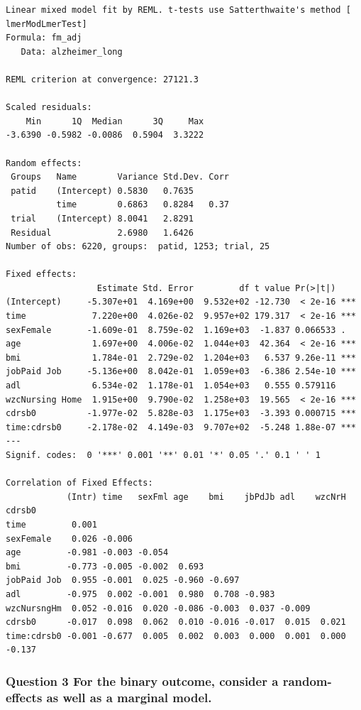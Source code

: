 \documentclass[
  11pt,
  letterpaper,
  DIV=11,
  numbers=noendperiod]{scrartcl}
\begin{document}
\begin{verbatim}
Linear mixed model fit by REML. t-tests use Satterthwaite's method [
lmerModLmerTest]
Formula: fm_adj
   Data: alzheimer_long

REML criterion at convergence: 27121.3

Scaled residuals: 
    Min      1Q  Median      3Q     Max 
-3.6390 -0.5982 -0.0086  0.5904  3.3222 

Random effects:
 Groups   Name        Variance Std.Dev. Corr
 patid    (Intercept) 0.5830   0.7635       
          time        0.6863   0.8284   0.37
 trial    (Intercept) 8.0041   2.8291       
 Residual             2.6980   1.6426       
Number of obs: 6220, groups:  patid, 1253; trial, 25

Fixed effects:
                  Estimate Std. Error         df t value Pr(>|t|)    
(Intercept)     -5.307e+01  4.169e+00  9.532e+02 -12.730  < 2e-16 ***
time             7.220e+00  4.026e-02  9.957e+02 179.317  < 2e-16 ***
sexFemale       -1.609e-01  8.759e-02  1.169e+03  -1.837 0.066533 .  
age              1.697e+00  4.006e-02  1.044e+03  42.364  < 2e-16 ***
bmi              1.784e-01  2.729e-02  1.204e+03   6.537 9.26e-11 ***
jobPaid Job     -5.136e+00  8.042e-01  1.059e+03  -6.386 2.54e-10 ***
adl              6.534e-02  1.178e-01  1.054e+03   0.555 0.579116    
wzcNursing Home  1.915e+00  9.790e-02  1.258e+03  19.565  < 2e-16 ***
cdrsb0          -1.977e-02  5.828e-03  1.175e+03  -3.393 0.000715 ***
time:cdrsb0     -2.178e-02  4.149e-03  9.707e+02  -5.248 1.88e-07 ***
---
Signif. codes:  0 '***' 0.001 '**' 0.01 '*' 0.05 '.' 0.1 ' ' 1

Correlation of Fixed Effects:
            (Intr) time   sexFml age    bmi    jbPdJb adl    wzcNrH cdrsb0
time         0.001                                                        
sexFemale    0.026 -0.006                                                 
age         -0.981 -0.003 -0.054                                          
bmi         -0.773 -0.005 -0.002  0.693                                   
jobPaid Job  0.955 -0.001  0.025 -0.960 -0.697                            
adl         -0.975  0.002 -0.001  0.980  0.708 -0.983                     
wzcNursngHm  0.052 -0.016  0.020 -0.086 -0.003  0.037 -0.009              
cdrsb0      -0.017  0.098  0.062  0.010 -0.016 -0.017  0.015  0.021       
time:cdrsb0 -0.001 -0.677  0.005  0.002  0.003  0.000  0.001  0.000 -0.137
\end{verbatim}

\subsubsection{Question 3 For the binary outcome, consider a
random-effects as well as a marginal
model.}\label{question-3-for-the-binary-outcome-consider-a-random-effects-as-well-as-a-marginal-model.}
\end{document}
